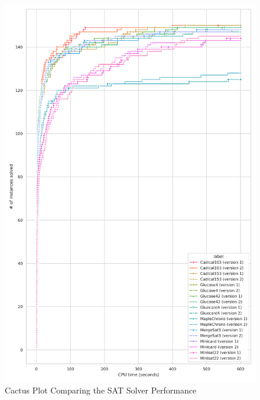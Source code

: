 \begin{figure}[htbp]
\centering
\includegraphics[scale=0.7]{Thesis/figures/minibenchmark_cactus_plot_runtime_SAT_with_holes.png}
\caption{Cactus Plot Comparing the SAT Solver Performance}
\label{fig:cactus_SAT}
\end{figure}

